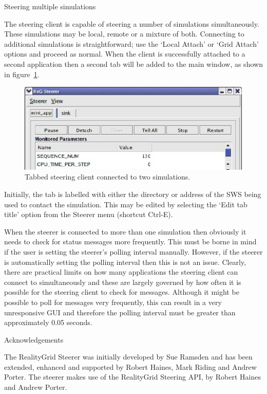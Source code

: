 \documentclass[a4paper,twoside]{article}
\begin{document}
\begin{section}{Steering multiple simulations}
\label{sec:multiple_sims}

The steering client is capable of steering a number of simulations
simultaneously.  These simulations may be local, remote or a mixture
of both.  Connecting to additional simulations is straightforward; use
the `Local Attach' or `Grid Attach' options and proceed as normal.  When
the client is successfully attached to a second application then a
second tab will be added to the main window, as shown in
figure~\ref{fig:tabbed}.

\begin{figure}
\centerline{\includegraphics{tabbed_steerer.eps}}
\caption{Tabbed steering client connected to two simulations.}
\label{fig:tabbed}
\end{figure}

Initially, the tab is labelled with either the directory or address of the
SWS being used to contact the simulation.  This may be edited by
selecting the `Edit tab title' option from the Steerer menu (shortcut
Ctrl-E).

When the steerer is connected to more than one simulation then
obviously it needs to check for status messages more frequently.  This
must be borne in mind if the user is setting the steerer's polling
interval manually.  However, if the steerer is automatically setting
the polling interval then this is not an issue.  Clearly, there are
practical limits on how many applications the steering client can
connect to simultaneously and these are largely governed by how often
it is possible for the steering client to check for messages.
Although it might be possible to poll for messages very frequently,
this can result in a very unresponsive GUI and therefore the polling
interval must be greater than approximately 0.05 seconds.

\end{section} %


\begin{section}{Acknowledgements}

The RealityGrid Steerer was initially developed by Sue Ramsden and has
been extended, enhanced and supported by Robert Haines, Mark Riding
and Andrew Porter. The steerer makes use of the RealityGrid Steering
API, by Robert Haines and Andrew Porter.

\end{section}
\end{document}
